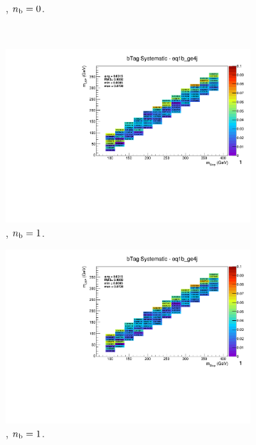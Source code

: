 \begin{figure}[ht!]
\begin{subfigure}[b]{0.32\textwidth}
    \caption{\njhigh, $n_{\text{b}} = 0$.}
  \end{subfigure}\\
  \begin{subfigure}[b]{0.32\textwidth}
    \includegraphics[width=\textwidth, page=12]{Figs/sms/t2degen/v19/systs_v2/T2_4body_bTag_eq1b_ge4j.pdf}
    \caption{\njhigh, $n_{\text{b}} = 1$.}
  \end{subfigure}
  \begin{subfigure}[b]{0.32\textwidth}
    \includegraphics[width=\textwidth, page=8]{Figs/sms/t2degen/v19/systs_v2/T2_4body_bTag_eq1b_ge4j.pdf}
    \caption{\njhigh, $n_{\text{b}} = 1$.}
  \end{subfigure}
  \begin{subfigure}[b]{0.32\textwidth}

\end{subfigure}
\end{figure}
